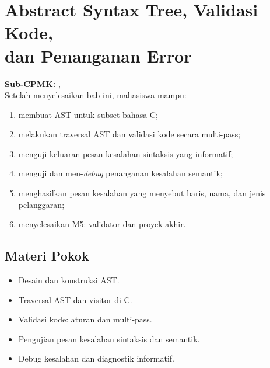 \documentclass[../../main.tex]{subfiles}
\begin{document}
\chapter[AST, Validasi Kode, dan Penanganan Error]{Abstract Syntax Tree, Validasi Kode,\\ dan Penanganan Error}
\label{chap:ast-validasi}

\begin{outcomebox}
\textbf{Sub-CPMK:} , \\[3pt]
Setelah menyelesaikan bab ini, mahasiswa mampu:
\begin{enumerate}[label=\arabic*.,leftmargin=*]
  \item membuat AST untuk subset bahasa C;
  \item melakukan traversal AST dan validasi kode secara multi-pass;
  \item menguji keluaran pesan kesalahan sintaksis yang informatif;
  \item menguji dan men-\textit{debug} penanganan kesalahan semantik;
  \item menghasilkan pesan kesalahan yang menyebut baris, nama, dan
        jenis pelanggaran;
  \item menyelesaikan M5: validator dan proyek akhir.
\end{enumerate}
\end{outcomebox}

\section*{Materi Pokok}
\begin{itemize}[leftmargin=*]
  \item Desain dan konstruksi AST.
  \item Traversal AST dan visitor di C.
  \item Validasi kode: aturan dan multi-pass.
  \item Pengujian pesan kesalahan sintaksis dan semantik.
  \item Debug kesalahan dan diagnostik informatif.
\end{itemize}















\ifSubfilesClassLoaded{%
}{}
\end{document}
